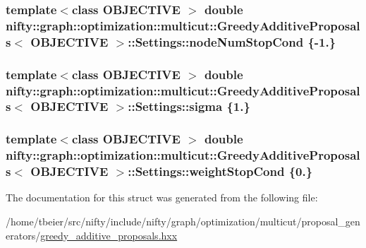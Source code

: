 \subsubsection[{node\+Num\+Stop\+Cond}]{\setlength{\rightskip}{0pt plus 5cm}template$<$class O\+B\+J\+E\+C\+T\+I\+V\+E $>$ double {\bf nifty\+::graph\+::optimization\+::multicut\+::\+Greedy\+Additive\+Proposals}$<$ O\+B\+J\+E\+C\+T\+I\+V\+E $>$\+::Settings\+::node\+Num\+Stop\+Cond \{-\/1.\}}\label{structnifty_1_1graph_1_1optimization_1_1multicut_1_1GreedyAdditiveProposals_1_1Settings_a90c4649e0ba19d2305535c0d938a7082}
\hypertarget{structnifty_1_1graph_1_1optimization_1_1multicut_1_1GreedyAdditiveProposals_1_1Settings_ac5c585589c27b863b9115faac8724c47}{}
\subsubsection[{sigma}]{\setlength{\rightskip}{0pt plus 5cm}template$<$class O\+B\+J\+E\+C\+T\+I\+V\+E $>$ double {\bf nifty\+::graph\+::optimization\+::multicut\+::\+Greedy\+Additive\+Proposals}$<$ O\+B\+J\+E\+C\+T\+I\+V\+E $>$\+::Settings\+::sigma \{1.\}}\label{structnifty_1_1graph_1_1optimization_1_1multicut_1_1GreedyAdditiveProposals_1_1Settings_ac5c585589c27b863b9115faac8724c47}
\hypertarget{structnifty_1_1graph_1_1optimization_1_1multicut_1_1GreedyAdditiveProposals_1_1Settings_ae1fee66127072c3aee62635fd016ca6c}{}
\subsubsection[{weight\+Stop\+Cond}]{\setlength{\rightskip}{0pt plus 5cm}template$<$class O\+B\+J\+E\+C\+T\+I\+V\+E $>$ double {\bf nifty\+::graph\+::optimization\+::multicut\+::\+Greedy\+Additive\+Proposals}$<$ O\+B\+J\+E\+C\+T\+I\+V\+E $>$\+::Settings\+::weight\+Stop\+Cond \{0.\}}\label{structnifty_1_1graph_1_1optimization_1_1multicut_1_1GreedyAdditiveProposals_1_1Settings_ae1fee66127072c3aee62635fd016ca6c}


The documentation for this struct was generated from the following file\+:\begin{DoxyCompactItemize}
\item 
/home/tbeier/src/nifty/include/nifty/graph/optimization/multicut/proposal\+\_\+generators/\hyperlink{greedy__additive__proposals_8hxx}{greedy\+\_\+additive\+\_\+proposals.\+hxx}\end{DoxyCompactItemize}
